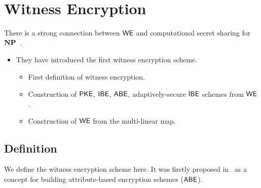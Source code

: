 \section{Witness Encryption}

There is a strong connection between $\mathsf{WE}$ and computational secret sharing for ${\mathbf{NP}}$~\cite{STOC:GGSW13}.

\begin{itemize}
    \item \cite{STOC:GGSW13} They have introduced the first witness encryption scheme.
    \begin{itemize}
        \item First definition of witness encryption.
        \item Construction of $\mathsf{PKE}$, $\mathsf{IBE}$, $\mathsf{ABE}$, adaptively-secure $\mathsf{IBE}$ schemes from $\mathsf{WE}$.
        \item Construction of $\mathsf{WE}$ from the multi-linear map.
    \end{itemize}
\end{itemize}

\subsection{Definition}

We define the witness encryption scheme here. It was firstly proposed in~\cite{STOC:GGSW13} as a concept for building attribute-based encryption schemes ($\mathsf{ABE}$).

